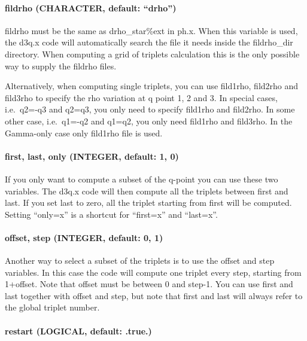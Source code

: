 \documentclass[
]{article}
\begin{document}
\hypertarget{fildrho-character-default-drho}{%
\paragraph{\texorpdfstring{fildrho (CHARACTER, default:
\enquote{drho})}{fildrho (CHARACTER, default: ``drho'')}}\label{fildrho-character-default-drho}}

fildrho must be the same as drho\_star\%ext in ph.x. When this variable
is used, the d3q.x code will automatically search the file it needs
inside the fildrho\_dir directory. When computing a grid of triplets
calculation this is the only possible way to supply the fildrho files.

Alternatively, when computing single triplets, you can use fild1rho,
fild2rho and fild3rho to specify the rho variation at q point 1, 2 and
3. In special cases, i.e.~q2=-q3 and q2=q3, you only need to specify
fild1rho and fild2rho. In some other case, i.e.~q1=-q2 and q1=q2, you
only need fild1rho and fild3rho. In the Gamma-only case only fild1rho
file is used.

\hypertarget{first-last-only-integer-default-1-0}{%
\paragraph{first, last, only (INTEGER, default: 1,
0)}\label{first-last-only-integer-default-1-0}}

If you only want to compute a subset of the q-point you can use these
two variables. The d3q.x code will then compute all the triplets between
first and last. If you set last to zero, all the triplet starting from
first will be computed. Setting \enquote{only=x} is a shortcut for
\enquote{first=x} and \enquote{last=x}.

\hypertarget{offset-step-integer-default-0-1}{%
\paragraph{offset, step (INTEGER, default: 0,
1)}\label{offset-step-integer-default-0-1}}

Another way to select a subset of the triplets is to use the offset and
step variables. In this case the code will compute one triplet every
step, starting from 1+offset. Note that offset must be between 0 and
step-1. You can use first and last together with offset and step, but
note that first and last will always refer to the global triplet number.

\hypertarget{restart-logical-default-.true.}{%
\paragraph{restart (LOGICAL, default:
.true.)}\label{restart-logical-default-.true.}}
\end{document}

